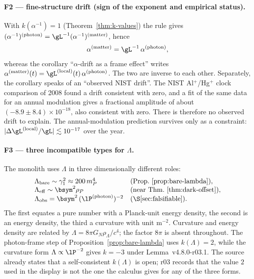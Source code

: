 \paragraph{F2 --- fine-structure drift (sign of the exponent and empirical status).}
With \(k(\alpha^{-1})=1\) (Theorem~\ref{thm:k-values}) the rule gives
\((\alpha^{-1})^{(\mathrm{photon})}=\gL^{-1}(\alpha^{-1})^{(\mathrm{matter})}\), hence
\[
\alpha^{(\mathrm{matter})}=\gL^{-1}\,\alpha^{(\mathrm{photon})},
\]
whereas the corollary ``\(\alpha\)-drift as a frame effect'' writes
\(\alpha^{(\mathrm{matter})}(t)=\gL^{(\mathrm{local})}(t)\,\alpha^{(\mathrm{photon})}\).  The two
are inverse to each other.  Separately, the corollary speaks of an ``observed NIST drift''.  The
NIST Al\(^+\)/Hg\(^+\) clock comparison of 2008 found a drift consistent with zero, and a fit of
the same data for an annual modulation gives a fractional amplitude of about
\((-8.9\pm8.4)\times10^{-18}\), also consistent with zero.  There is therefore no observed drift
to explain.  The annual-modulation prediction survives only as a constraint:
\(|\Delta\gL^{(\mathrm{local})}/\gL|\lesssim10^{-17}\) over the year.

\paragraph{F3 --- three incompatible types for \(\Lambda\).}
The monolith uses \(\Lambda\) in three dimensionally different roles:
\[
\begin{array}{ll}
\Lambda_{\mathrm{bare}}\sim\gamma_1^2\approx200\,m_P^4 & (\text{Prop.~\ref{prop:bare-lambda}}),\\
\Lambda_{\mathrm{eff}}\sim\bsym^2\rho_P & (\text{near Thm.~\ref{thm:dark-offset}}),\\
\Lambda_{\mathrm{obs}}=\bsym^2\,(\lP^{(\mathrm{photon})})^{-2} & (\text{\S\ref{sec:falsifiable}}).
\end{array}
\]
The first equates a pure number with a Planck-unit energy density, the second is an energy
density, the third a curvature with unit \(\mathrm{m}^{-2}\).  Curvature and energy density are
related by \(\Lambda=8\pi G_N\rho_\Lambda/c^4\); the factor \(8\pi\) is absent throughout.  The
photon-frame step of Proposition~\ref{prop:bare-lambda} uses \(k(\Lambda)=2\), while the
curvature form \(\Lambda\propto\lP^{-2}\) gives \(k=-3\) under Lemma~v4.8.0-r03.1.  The source
already states that a self-consistent \(k(\Lambda)\) is open; r03 records that the value \(2\)
used in the display is not the one the calculus gives for any of the three forms.

